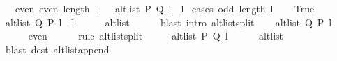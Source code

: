 \begin{isabellebody}
\ \ \ even{\isacharcolon}{\kern0pt}\ {\isachardoublequoteopen}even\ {\isacharparenleft}{\kern0pt}length\ l{}{\isacharparenright}{\kern0pt}{\isachardoublequoteclose}\isanewline
\ \ \ {\isachardoublequoteopen}alt{\isacharunderscore}{\kern0pt}list\ P\ Q\ {\isacharparenleft}{\kern0pt}l{}\ {\isacharat}{\kern0pt}\ l{}{\isacharparenright}{\kern0pt}{\isachardoublequoteclose}%
\endisataginvisible
{\isafoldinvisible}%
%
\isadeliminvisible
\isanewline
%
\endisadeliminvisible
%
\isadelimproof
%
\endisadelimproof
%
\isatagproof
{}\isamarkupfalse%
\ {\isacharparenleft}{\kern0pt}cases\ {\isachardoublequoteopen}odd\ {\isacharparenleft}{\kern0pt}length\ l{}{\isacharparenright}{\kern0pt}{\isachardoublequoteclose}{\isacharparenright}{\kern0pt}\isanewline
\ \ \isamarkupfalse%
\ True\isanewline
\ \ \isamarkupfalse%
\ {\isachardoublequoteopen}alt{\isacharunderscore}{\kern0pt}list\ Q\ P\ {\isacharparenleft}{\kern0pt}l{}\ {\isacharat}{\kern0pt}\ l{}{\isacharparenright}{\kern0pt}{\isachardoublequoteclose}\isanewline
\ \ \ \ \isamarkupfalse%
\ alt{\isacharunderscore}{\kern0pt}list\isanewline
\ \ \ \ \isamarkupfalse%
\ {\isacharparenleft}{\kern0pt}blast\ intro{\isacharcolon}{\kern0pt}\ alt{\isacharunderscore}{\kern0pt}list{\isacharunderscore}{\kern0pt}split{\isacharunderscore}{\kern0pt}{}{\isacharparenright}{\kern0pt}\isanewline
\ \ \isamarkupfalse%
\ {\isachardoublequoteopen}alt{\isacharunderscore}{\kern0pt}list\ Q\ P\ l{}{\isachardoublequoteclose}\isanewline
\ \ \ \ \isamarkupfalse%
\ even\isanewline
\ \ \ \ \isamarkupfalse%
\ {\isacharparenleft}{\kern0pt}rule\ alt{\isacharunderscore}{\kern0pt}list{\isacharunderscore}{\kern0pt}split{\isacharunderscore}{\kern0pt}{}{\isacharparenright}{\kern0pt}\isanewline
\ \ \isamarkupfalse%
\ \isamarkupfalse%
\ {\isachardoublequoteopen}alt{\isacharunderscore}{\kern0pt}list\ P\ Q\ l{}{\isachardoublequoteclose}\isanewline
\ \ \ \ \isamarkupfalse%
\ alt{\isacharunderscore}{\kern0pt}list\isanewline
\ \ \ \ \isamarkupfalse%
\ {\isacharparenleft}{\kern0pt}blast\ dest{\isacharcolon}{\kern0pt}\ alt{\isacharunderscore}{\kern0pt}list{\isacharunderscore}{\kern0pt}append{\isacharunderscore}{\kern0pt}{}{\isacharparenright}{\kern0pt}\isanewline
\ \ \isamarkupfalse%
\ \isamarkupfalse%

\end{isabellebody}

